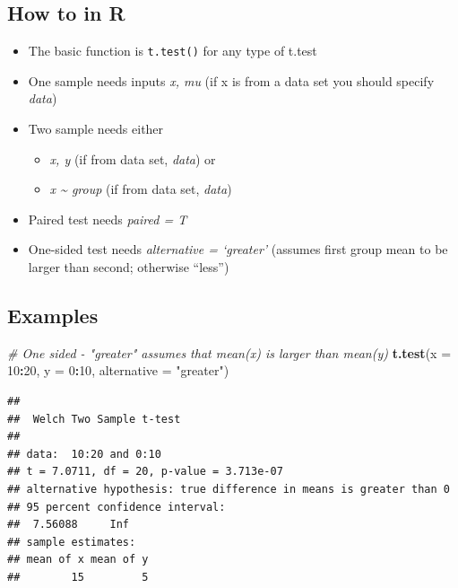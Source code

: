 \documentclass[
]{book}
\newenvironment{Shaded}{\begin{snugshade}}{\end{snugshade}}
\newcommand{\AttributeTok}[1]{\textcolor[rgb]{0.13,0.29,0.53}{#1}}
\newcommand{\CommentTok}[1]{\textcolor[rgb]{0.56,0.35,0.01}{\textit{#1}}}
\newcommand{\DecValTok}[1]{\textcolor[rgb]{0.00,0.00,0.81}{#1}}
\newcommand{\FunctionTok}[1]{\textcolor[rgb]{0.13,0.29,0.53}{\textbf{#1}}}
\newcommand{\NormalTok}[1]{#1}
\newcommand{\SpecialCharTok}[1]{\textcolor[rgb]{0.81,0.36,0.00}{\textbf{#1}}}
\newcommand{\StringTok}[1]{\textcolor[rgb]{0.31,0.60,0.02}{#1}}
\providecommand{\tightlist}{%
  \setlength{\itemsep}{0pt}\setlength{\parskip}{0pt}}
\begin{document}
\subsection{How to in R}\label{how-to-in-r-1}

\begin{itemize}
\tightlist
\item
  The basic function is \texttt{t.test()} for any type of t.test
\item
  One sample needs inputs \emph{x, mu} (if x is from a data set you should specify \emph{data})
\item
  Two sample needs either

  \begin{itemize}
  \tightlist
  \item
    \emph{x, y} (if from data set, \emph{data}) or
  \item
    \emph{x \textasciitilde{} group} (if from data set, \emph{data})
  \end{itemize}
\item
  Paired test needs \emph{paired = T}
\item
  One-sided test needs \emph{alternative = `greater'} (assumes first group mean to be larger than second; otherwise ``less'')
\end{itemize}

\subsection{Examples}\label{examples}

\begin{Shaded}
\begin{Highlighting}[]
\CommentTok{\# One sided {-} "greater" assumes that mean(x) is larger than mean(y)}
\FunctionTok{t.test}\NormalTok{(}\AttributeTok{x =} \DecValTok{10}\SpecialCharTok{:}\DecValTok{20}\NormalTok{, }\AttributeTok{y =} \DecValTok{0}\SpecialCharTok{:}\DecValTok{10}\NormalTok{, }\AttributeTok{alternative =} \StringTok{"greater"}\NormalTok{)}
\end{Highlighting}
\end{Shaded}

\begin{verbatim}
## 
##  Welch Two Sample t-test
## 
## data:  10:20 and 0:10
## t = 7.0711, df = 20, p-value = 3.713e-07
## alternative hypothesis: true difference in means is greater than 0
## 95 percent confidence interval:
##  7.56088     Inf
## sample estimates:
## mean of x mean of y 
##        15         5
\end{verbatim}
\end{document}
